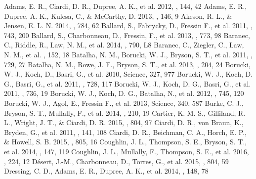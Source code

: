 \documentclass[twocolumn,appendixfloats]{aastex6}
\begin{document}
\newpage

\begin{thebibliography}{}
 Adams, E. R., Ciardi, D. R., Dupree, A. K.,
et al.  2012, \aj, 144, 42
 Adams, E. R., Dupree, A. K., Kulesa, C.,
\& McCarthy, D.  2013, \aj, 146, 9 
 Akeson, R. L., \& Jensen, E. L. N.
2014, \apj, 784, 62
 Ballard, S., Fabrycky, D., Fressin F., et al.
2011, \apj, 743, 200
 Ballard, S., Charbonneau, D., Fressin, F.,
et al.  2013, \apj, 773, 98
 Baranec, C., Riddle, R., Law, N. M., et al.
2014, \apj, 790, L8
 Baranec, C., Ziegler, C., Law, N. M., et al.
\aj, 152, 18
 Batalha, N. M., Borucki, W. J., Bryson, S. T.,
et al.  2011, \apj, 729, 27
 Batalha, N. M., Rowe, J. F., Bryson, S. T.,
et al.  2013, \apjs, 204, 24
 Borucki, W. J., Koch, D., Basri, G., et al.
2010, Science, 327, 977 
 Borucki, W. J., Koch, D. G., Basri, G., 
et al. 2011, \apj, 728, 117
 Borucki, W. J., Koch, D. G., Basri, G., 
et al. 2011, \apj, 736, 19
 Borucki, W. J., Koch, D. G., Batalha, N.,
et al.  2012, \apj, 745, 120
 Borucki, W. J., Agol, E., Fressin F., et al.
2013, Science, 340, 587
 Burke, C. J., Bryson, S. T., Mullally, F., 
et al.  2014, \apjs, 210, 19
 Cartier, K. M. S., Gilliland, R. L., Wright, J. T.,
\& Ciardi, D. R.  2015, \apj, 804, 97
 Ciardi, D. R., von Braun, K., Bryden, G., et al.
2011, \aj, 141, 108
 Ciardi, D. R., Beichman, C. A., Horch, E. P.,
\& Howell, S. B.  2015, \apj, 805, 16
 Coughlin, J. L., Thompson, S. E., 
Bryson, S. T., et al.  2014, \aj, 147, 119
 Coughlin, J. L., Mullally, F., Thompson, S. E.,
et al.  2016, \apjs, 224, 12
 D\'esert, J.-M., Charbonneau, D., Torres, G.,
et al.  2015, \apj, 804, 59
 Dressing, C. D., Adams, E. R., Dupree, A. K.,
et al.  2014, \aj, 148, 78

\end{thebibliography}
\end{document}
